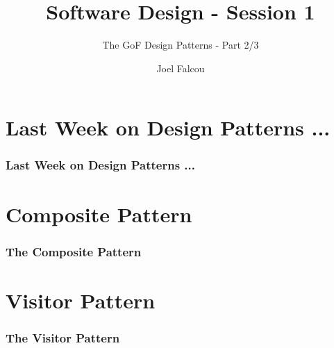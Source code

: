 \documentclass{beamer}
\title{Software Design - Session 1}
\subtitle{The GoF Design Patterns - Part 2/3}
\author{Joel Falcou}
\institute{Laboratoire de Recherche en Informatique - Université Paris Sud 11}
\date{}
\begin{document}
\section{Last Week on Design Patterns ...}
\frame
{
  \frametitle{Last Week on Design Patterns ...}
}

\frame{}

\section{Composite Pattern}
\frame
{
  \frametitle{The Composite Pattern}
}

\frame
{

}

\section{Visitor Pattern}
\frame
{
  \frametitle{The Visitor Pattern}
}

\frame{}
\end{document}
